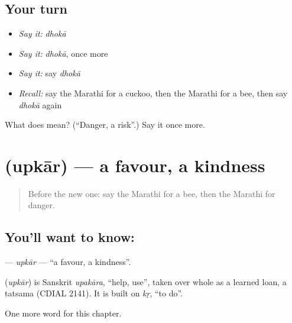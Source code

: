 \subsection*{Your turn}
\begin{itemize}
\raggedright
  \item \emph{Say it:} \emph{dhokā}
  \item \emph{Say it:} \emph{dhokā}, once more
  \item \emph{Say it:} say \emph{dhokā}
  \item \emph{Recall:} say the Marathi for a cuckoo, then the Marathi for a bee, then say \emph{dhokā} again
\end{itemize}

\begin{tcolorbox}[breakable,colback=teal!4,colframe=teal!35!black,title={Before you move on}]
What does  mean? (\textquotedblleft{}Danger, a risk\textquotedblright{}.) Say it once more.
\end{tcolorbox}
\section[\texorpdfstring{\mr{उपकार} (upkār)}{उपकार (upkār)}]{ (upkār) — a favour, a kindness}

\label{lesson:MR-C189-upkar}



\begin{quote}
Before the new one: say the Marathi for a bee, then the Marathi for danger.
\end{quote}

\subsection*{You'll want to know: }
\textbf{} — \emph{upkār} — \textquotedblleft{}a favour, a kindness\textquotedblright{}.

\begin{cousinweb}
\textbf{} (\emph{upkār}) is Sanskrit \emph{upakāra}, \textquotedblleft{}help, use\textquotedblright{}, taken over whole as a learned loan, a tatsama (CDIAL 2141). It is built on \emph{kṛ}, \textquotedblleft{}to do\textquotedblright{}.
\end{cousinweb}

\begin{grammarlens}[title={What you've built}]
One more word for this chapter.
\end{grammarlens}

